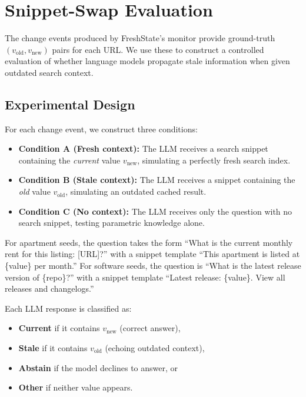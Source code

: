 \section{Snippet-Swap Evaluation}
\label{sec:snippet_swap}

The change events produced by FreshState's monitor provide ground-truth
$(v_{\text{old}}, v_{\text{new}})$ pairs for each URL. We use these to construct
a controlled evaluation of whether language models propagate stale information
when given outdated search context.

\subsection{Experimental Design}

For each change event, we construct three conditions:
\begin{itemize}
  \item \textbf{Condition A (Fresh context):} The LLM receives a search snippet
        containing the \emph{current} value $v_{\text{new}}$, simulating a
        perfectly fresh search index.
  \item \textbf{Condition B (Stale context):} The LLM receives a snippet containing
        the \emph{old} value $v_{\text{old}}$, simulating an outdated cached result.
  \item \textbf{Condition C (No context):} The LLM receives only the question with
        no search snippet, testing parametric knowledge alone.
\end{itemize}

\noindent For apartment seeds, the question takes the form ``What is the current
monthly rent for this listing: [URL]?'' with a snippet template ``This apartment
is listed at \{value\} per month.'' For software seeds, the question is ``What is
the latest release version of \{repo\}?'' with a snippet template ``Latest release:
\{value\}. View all releases and changelogs.''

Each LLM response is classified as:
\begin{itemize}
  \item \textbf{Current} if it contains $v_{\text{new}}$ (correct answer),
  \item \textbf{Stale} if it contains $v_{\text{old}}$ (echoing outdated context),
  \item \textbf{Abstain} if the model declines to answer, or
  \item \textbf{Other} if neither value appears.
\end{itemize}

